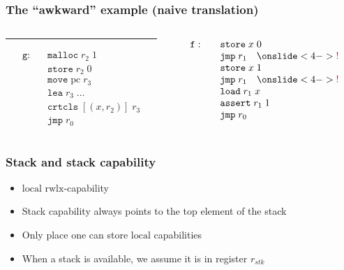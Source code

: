 \documentclass{beamer}
\newcommand{\var}[1]{\mathit{#1}}
\newcommand{\pcreg}{\mathrm{pc}}
\newcommand{\stk}{\var{stk}}
\newcommand{\plaindom}[1]{\mathrm{#1}}
\newcommand{\zinstr}[1]{\mathtt{#1}}
\newcommand{\oneinstr}[2]{\zinstr{#1} \; #2}
\newcommand{\jmp}[1]{\oneinstr{jmp}{#1}}
\newcommand{\twoinstr}[3]{\zinstr{#1} \; #2 \; #3}
\newcommand{\move}[2]{\twoinstr{move}{#1}{#2}}
\newcommand{\store}[2]{\twoinstr{store}{#1}{#2}}
\newcommand{\load}[2]{\twoinstr{load}{#1}{#2}}
\newcommand{\lea}[2]{\twoinstr{lea}{#1}{#2}}
\newcommand{\plainperm}[1]{\mathrm{#1}}
\newcommand{\rwlx}{\plainperm{rwlx}}
\newcommand{\local}{\plainperm{local}}
\begin{document}
\begin{frame}
 \frametitle{The ``awkward'' example (naive translation)}
 \begin{columns}
 \begin{column}{0.45\textwidth}
   \usebox{\awkwardex}
\rule{\textwidth}{0.4pt}
\[
  \begin{array}{lcl}
\mathtt{g}:
  &  &\mathtt{malloc} \; r_2 \; 1\\
  &  &\store{r_2}{0}\\
  &  &\move{\pcreg}{r_3}\\
  &  &\lea{r_3}{\dots}\\
  &  &\mathtt{crtcls} \;[(x, r_2)] \; r_3\\
  &  &\jmp{r_0}
  \end{array}
\]
 \end{column}
 \begin{column}{0.45\textwidth}
\[
\begin{array}{lcl}
\mathtt{f:}
  &  &\store{x}{0}\\
  &  &\jmp{r_1} \quad \onslide<4->{\color{red} !} \\ %
  &  &\store{x}{1}\\
  &  &\jmp{r_1} \quad \onslide<4->{\color{red} !}\\ %
  &  &\load{r_1}{x}\\
  &  &\mathtt{assert} \; r_1 \; 1\\
  &  &\jmp{r_0}
  \end{array}
\]
 \end{column}
\end{columns}
\end{frame}

\begin{frame}
  \frametitle{Stack and stack capability}
  \begin{itemize}[<+->]
  \item $\local$ $\rwlx$-capability
  \item Stack capability always points to the top element of the stack
  \item Only place one can store $\local$ capabilities
  \item When a stack is available, we assume it is in register $r_\stk$
  \end{itemize}
\end{frame}
\end{document}
